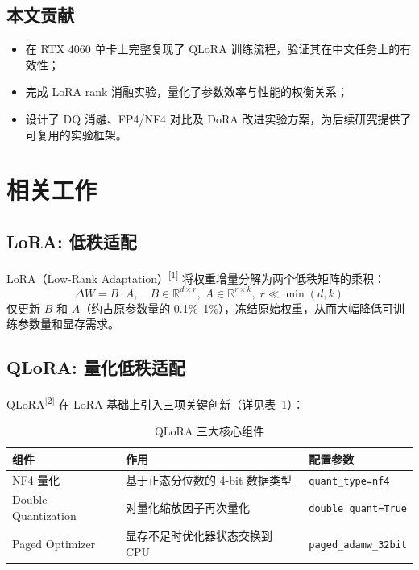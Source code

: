 \documentclass[12pt,a4paper]{article}
\begin{document}
\subsection{本文贡献}

\begin{itemize}[leftmargin=2em]
  \item 在 RTX 4060 单卡上完整复现了 QLoRA 训练流程，验证其在中文任务上的有效性；
  \item 完成 LoRA rank 消融实验，量化了参数效率与性能的权衡关系；
  \item 设计了 DQ 消融、FP4/NF4 对比及 DoRA 改进实验方案，为后续研究提供了可复用的实验框架。
\end{itemize}

\section{相关工作}

\subsection{LoRA: 低秩适配}

LoRA（Low-Rank Adaptation）\textsuperscript{[1]} 将权重增量分解为两个低秩矩阵的乘积：
\begin{equation}
  \Delta W = B \cdot A, \quad B \in \mathbb{R}^{d \times r}, \; A \in \mathbb{R}^{r \times k}, \; r \ll \min(d, k)
\end{equation}
仅更新 $B$ 和 $A$（约占原参数量的 0.1\%--1\%），冻结原始权重，从而大幅降低可训练参数量和显存需求。

\subsection{QLoRA: 量化低秩适配}

QLoRA\textsuperscript{[2]} 在 LoRA 基础上引入三项关键创新（详见表~\ref{tab:qlora_components}）：

\begin{table}[H]
\centering
\caption{QLoRA 三大核心组件}
\label{tab:qlora_components}
\small
\begin{tabularx}{\textwidth}{lXl}
\toprule
\textbf{组件} & \textbf{作用} & \textbf{配置参数} \\
\midrule
NF4 量化 & 基于正态分位数的 4-bit 数据类型 & \texttt{quant\_type=nf4} \\
Double Quantization & 对量化缩放因子再次量化 & \texttt{double\_quant=True} \\
Paged Optimizer & 显存不足时优化器状态交换到 CPU & \texttt{paged\_adamw\_32bit} \\
\bottomrule
\end{tabularx}
\end{table}
\end{document}
